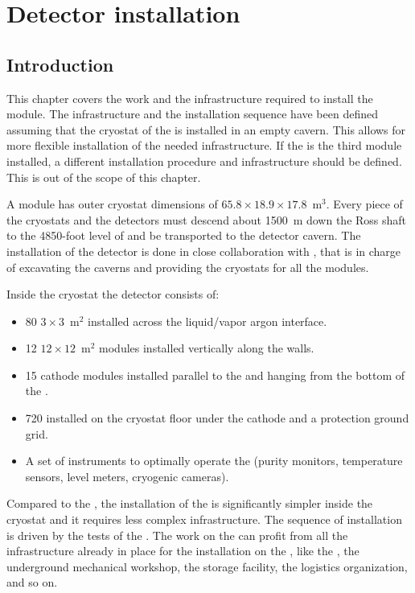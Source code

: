 \chapter{Detector installation}
\label{ch:dp-installation}

\section{Introduction}
\label{ch:dp-install-intro}

This chapter covers the work and the infrastructure required to install the    module.
The infrastructure and the installation sequence have been defined assuming that the cryostat of the  is installed in an empty cavern.
This allows for more flexible installation of the needed infrastructure.
If the  is the third module installed, a different installation procedure and infrastructure should be defined.
This is out of the scope of this chapter.

A   module has outer cryostat dimensions of $65.8 \times 18.9 \times 17.8$~m$^3$.
Every piece of the cryostats and the detectors must descend about 1500~m down the Ross shaft to the 4850-foot level of  and be transported to the detector cavern.
The installation of the detector is done in close collaboration with , that is in charge of  excavating the caverns and providing the cryostats for all the  modules.

Inside the cryostat the  detector consists of:
\begin{itemize}
\item 80 $3 \times 3$~m$^2$  installed across the liquid/vapor argon interface.
\item  12 $12 \times 12$~m$^2$  modules installed vertically along the walls.
\item  15 cathode modules  installed parallel to the  and hanging from the bottom of the .
\item  720  installed on the cryostat floor under the cathode and a protection ground grid.
\item  A set of instruments to optimally operate the  (purity monitors, temperature sensors, level meters, cryogenic cameras).
\end{itemize}

Compared to the , the installation of the  is significantly simpler inside the cryostat and it requires less complex infrastructure.
The sequence of installation is driven by the tests of the .
The work on the  can profit from all the infrastructure already in place for the installation on the , like the , the underground mechanical workshop, the storage facility, the logistics organization, and so on.

